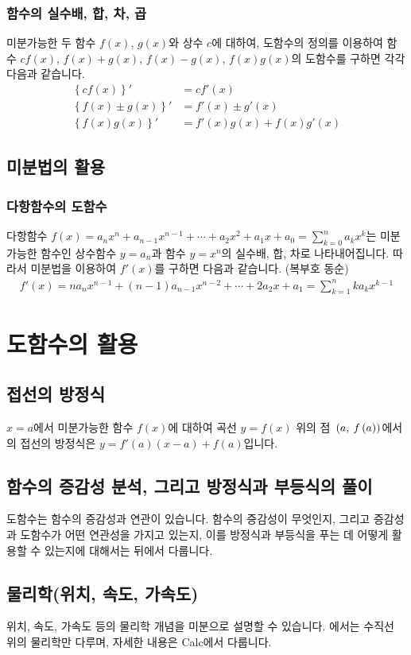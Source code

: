 \subsubsection{함수의 실수배, 합, 차, 곱}
미분가능한 두 함수 $f\left( x \right) $, $g\left( x \right) $와 상수 $c$에 대하여, 도함수의 정의를 이용하여 함수 $cf\left( x \right) $, $f\left( x \right)+g\left( x \right)  $, $f\left( x \right) - g\left( x \right) $, $f\left( x \right)g\left( x \right)  $의 도함수를 구하면 각각 다음과 같습니다.
\begin{align*}
\left\{ cf\left( x \right)  \right\} '
&= cf'\left( x \right) \\
\left\{  f\left( x \right) \pm g\left( x \right) \right\}'
&= f'\left( x \right) \pm g'\left( x \right) \\
\left\{  f\left( x \right)g\left( x \right) \right\}'
&= f'\left( x \right)g\left( x \right)  + f\left( x \right) g'\left( x \right)
\end{align*}


\subsection{미분법의 활용}
\subsubsection{다항함수의 도함수}
다항함수 $f\left( x \right) = a_n x^n + a_{n-1}x^{n-1} + \cdots + a_2x^2 + a_1x + a_0 = \sum_{k=0}^n a_k x^k$는 미분가능한 함수인 상수함수 $y=a_n$과 함수 $y=x^n$의 실수배, 합, 차로 나타내어집니다. 따라서 미분법을 이용하여 $f'\left( x \right) $를 구하면 다음과 같습니다. (복부호 동순)
\begin{align*} f'\left( x \right) = na_nx^{n-1} + (n-1)a_{n-1}x^{n-2} + \cdots + 2a_2x + a_1= \sum_{k=1}^{n} ka_k x^{k-1} \end{align*}

\section{도함수의 활용}
\subsection{접선의 방정식}
$x=a$에서 미분가능한 함수 $f\left( x \right) $에 대하여 곡선 $y=f\left( x \right) $ 위의 점 $\mathrm{}\left(a,\:f\left( a \right) \right)$에서의 접선의 방정식은 $y=f'\left( a \right) \left( x-a \right) +f\left( a \right) $입니다.
\subsection{함수의 증감성 분석, 그리고 방정식과 부등식의 풀이}
도함수는 함수의 증감성과 연관이 있습니다. 함수의 증감성이 무엇인지, 그리고 증감성과 도함수가 어떤 연관성을 가지고 있는지, 이를 방정식과 부등식을 푸는 데 어떻게 활용할 수 있는지에 대해서는 뒤에서 다룹니다.
\subsection{물리학(위치, 속도, 가속도)}
위치, 속도, 가속도 등의 물리학 개념을 미분으로 설명할 수 있습니다. 에서는 수직선 위의 물리학만 다루며, 자세한 내용은 Calc에서 다룹니다.